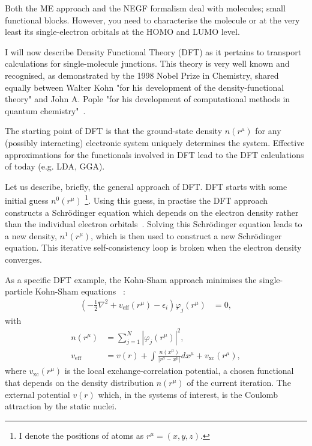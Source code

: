 Both the ME approach and the NEGF formalism deal with molecules; small functional blocks. However, you need to characterise the molecule or at the very least its single-electron orbitals at the HOMO and LUMO level. 

I will now describe Density Functional Theory (DFT) as it pertains to transport calculations for single-molecule junctions. This theory is very well known and recognised, as demonstrated by the 1998 Nobel Prize in Chemistry, shared equally between Walter Kohn "for his development of the density-functional theory" and John A. Pople "for his development of computational methods in quantum chemistry"~\cite{nobel1998}. 

The starting point of DFT is that the ground-state density $n(r^\mu)$ for any (possibly interacting) electronic system uniquely determines the system. Effective approxim\-ations for the functionals involved in DFT lead to the DFT calculations of today (e.g. LDA, GGA). 

Let us describe, briefly, the general approach of DFT. DFT starts with some initial guess $n^0(r^\mu)$ \footnote{I denote the positions of atoms as $r^\mu = (x,y,z)$.}. Using this guess, in practise the DFT approach constructs a Schr\"odinger equation which depends on the electron density rather than the individual electron orbit\-als~\cite{joscomp}. Solving this Schr\"odinger equation leads to a new density, $n^1(r^\mu)$, which is then used to construct a new Schr\"odinger equation. This iterative self-consistency loop is broken when the electron density converges.

As a specific DFT example, the Kohn-Sham approach minimises the single-particle Kohn-Sham equations ~\cite{kohnsham, joscomp}:
\begin{align}
\left( -\frac{1}{2} \nabla^2 + v_\text{eff} (r^\mu) - \epsilon_i \right) \varphi_j( r^\mu) &= 0, \label{eq:ks}
\end{align}
with
\begin{align*}
n(r^\mu) &= \sum_{j=1}^N \left| \varphi_j (r^\mu)\right|^2,\\
v_\text{eff} &= v(r) + \int \frac{n(x^\mu)}{\left|r^\mu - x^\mu\right|} dx^\mu + v_\text{xc}(r^\mu),
\end{align*}
where $v_\text{xc}(r^\mu)$ is the local exchange-correlation potential, a chosen functional that depends on the density distribution $n(r^\mu)$ of the current iteration. The external potential $v(r)$ which, in the systems of interest, is the Coulomb attraction by the static nuclei.


